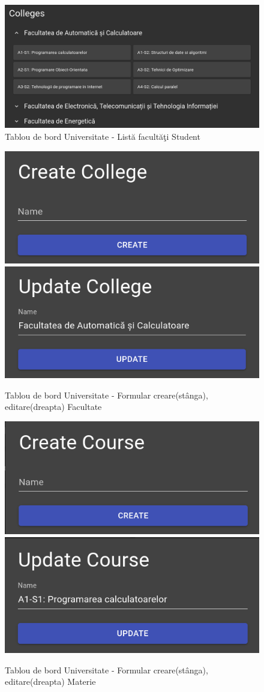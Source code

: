 \documentclass[12pt, a4paper, oneside, romanian]{teza-upb}
\begin{document}
\begin{figure}[H]
\centering
\includegraphics*[width=\columnwidth]{tablou-de-bord-universitate-lista-facultati-student}
\caption{Tablou de bord Universitate - Listă facultăţi Student}
\label{tablou-de-bord-universitate-lista-facultati-student}
\end{figure}

\begin{figure}[H]
\centering
\includegraphics*[width=0.45\columnwidth]{tablou-de-bord-universitate-formular-creare-facultate}
\includegraphics*[width=0.45\columnwidth]{tablou-de-bord-universitate-formular-editare-facultate}
\caption{Tablou de bord Universitate - Formular creare(stânga), editare(dreapta) Facultate}
\label{tablou-de-bord-universitate-formular-facultate}
\end{figure}

\begin{figure}[H]
\centering
\includegraphics*[width=0.45\columnwidth]{tablou-de-bord-universitate-formular-creare-materie}
\includegraphics*[width=0.45\columnwidth]{tablou-de-bord-universitate-formular-editare-materie}
\caption{Tablou de bord Universitate - Formular creare(stânga), editare(dreapta) Materie}
\label{tablou-de-bord-universitate-formular-materie}
\end{figure}
\end{document}
